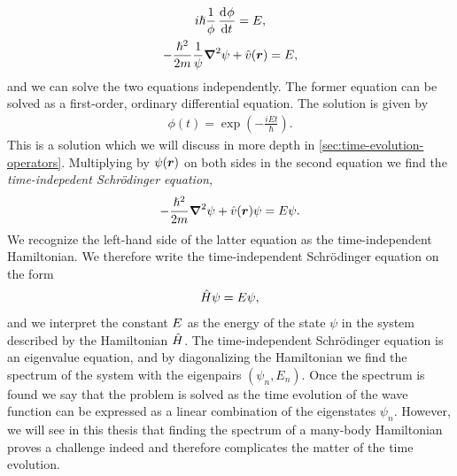         \begin{gather}
            i\hslash\frac{1}{\phi}\dod{\phi}{t} = \energy, \\
            -\frac{\hslash^2}{2m}\frac{1}{\psi}\vfg{\nabla}^2\psi
            + \hat{v}(\vfg{r}) = E,
        \end{gather}
        and we can solve the two equations independently.
        The former equation can be solved as a first-order, ordinary
        differential equation.
        The solution is given by
        \begin{align}
            \phi(t) = \exp(-\frac{iEt}{\hslash}).
        \end{align}
        This is a solution which we will discuss in more depth in
        \autoref{sec:time-evolution-operators}.
        Multiplying by $\psi(\boldsymbol{r})$ on both sides in the second equation we
        find the \emph{time-indepedent Schrödinger equation},
        \begin{align}
            -\frac{\hslash^2}{2m}\boldsymbol{\nabla}^2\psi + \hat{v}(\boldsymbol{r})\psi
            = E\psi.
        \end{align}
        We recognize the left-hand side of the latter equation as the
        time-independent Hamiltonian.
        We therefore write the time-independent Schrödinger equation on the form
        \begin{align}
            \hat{H}\psi = E\psi,
        \end{align}
        and we interpret the constant $E$ as the energy of the state
        $\psi$ in the system described by the Hamiltonian $\hat{H}$.
        The time-independent Schrödinger equation is an eigenvalue equation, and
        by diagonalizing the Hamiltonian we find the spectrum of the system with
        the eigenpairs $(\psi_n, E_n)$.
        Once the spectrum is found we say that the problem is solved as the
        time evolution of the wave function can be expressed as a linear
        combination of the eigenstates $\psi_n$.
        However, we will see in this thesis that finding the spectrum of a
        many-body Hamiltonian proves a challenge indeed and therefore
        complicates the matter of the time evolution.

